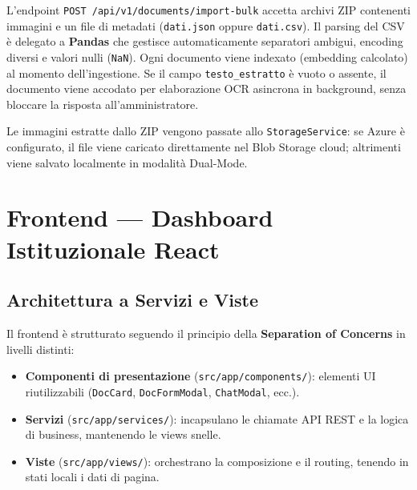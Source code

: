 \documentclass[12pt,a4paper,oneside]{report}
\begin{document}
L'endpoint \texttt{POST /api/v1/documents/import-bulk} accetta archivi ZIP contenenti
im\-ma\-gi\-ni e un file di metadati (\texttt{dati.json} oppure \texttt{dati.csv}).
Il parsing del CSV \`{e} delegato a \textbf{Pandas} che gestisce automaticamente separatori
ambigui, encoding diversi e valori nulli (\texttt{NaN}). Ogni documento viene indexato
(embedding calcolato) al momento dell'ingestione. Se il campo \texttt{testo\_estratto}
\`{e} vuoto o assente, il documento viene accodato per elaborazione OCR asincrona
in background, senza bloccare la risposta all'amministratore.

Le immagini estratte dallo ZIP vengono passate allo \texttt{StorageService}: se Azure
\`{e} configurato, il file viene caricato direttamente nel Blob Storage cloud; altrimenti
viene salvato localmente in modalit\`{a} Dual-Mode.

\chapter{Frontend --- Dashboard Istituzionale React}

\section{Architettura a Servizi e Viste}

Il frontend \`{e} strutturato seguendo il principio della \textbf{Separation of Concerns}
in livelli distinti:
\begin{itemize}
    \item \textbf{Componenti di presentazione} (\texttt{src/app/components/}): elementi UI
          riutilizzabili (\texttt{DocCard}, \texttt{DocFormModal}, \texttt{ChatModal}, ecc.).
    \item \textbf{Servizi} (\texttt{src/app/services/}): incapsulano le chiamate API REST
          e la logica di business, mantenendo le views snelle.
    \item \textbf{Viste} (\texttt{src/app/views/}): orchestrano la composizione e il routing,
          tenendo in stati locali i dati di pagina.
\end{itemize}
\end{document}
